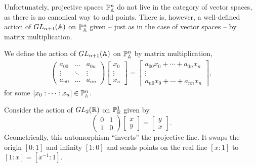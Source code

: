 \documentclass{../../mathnotes}
\begin{document}
Unfortunately,
projective spaces $\mathbb{P}_{\mathbb{A}}^n$ do not live in the category of vector spaces, as there is no canonical way to add points. 
There is, however, a well-defined action of $GL_{n+1}(\mathbb{A})$ on $\mathbb{P}_{\mathbb{A}}^n$ given -- just as in the case of vector spaces -- by matrix multiplication.

\begin{defn}
    We define the action of $GL_{n+1}(\mathbb{A})$ on $\mathbb{P}_{\mathbb{A}}^n$ by matrix multiplication,
    \begin{align*}
        \begin{pmatrix}
            a_{00}&\hdots & a_{0n}\\
            \vdots &\ddots & \vdots\\
            a_{n0}&\hdots & a_{nn}
        \end{pmatrix}
        \begin{bmatrix}
            x_0\\\vdots\\x_n
        \end{bmatrix}
        =
        \begin{bmatrix}
            a_{00}x_0+\cdots+a_{0n}x_n\\
            \vdots\\
            a_{n0}x_0+\cdots+a_{nn}x_n
        \end{bmatrix},
    \end{align*}
    for some $[x_0:\cdots:x_n]\in\mathbb{P}^n_{\mathbb{A}}$.
\end{defn}

\begin{exmp}
    Consider the action of $GL_2(\mathbb{R})$ on $\mathbb{P}^1_{\mathbb{R}}$ given by
    \[\begin{pmatrix}
        0&1\\
        1&0
    \end{pmatrix}
    \begin{bmatrix}
        x\\y
    \end{bmatrix}
    =
    \begin{bmatrix}
        y\\x
    \end{bmatrix}.\]
    Geometrically, this automorphism ``inverts'' the projective line. It swaps the origin $[0:1]$ and infinity $[1:0]$ and
    sends points on the real line $[x:1]$ to $[1:x]=[x^{-1}:1]$.
\end{exmp}
\end{document}
